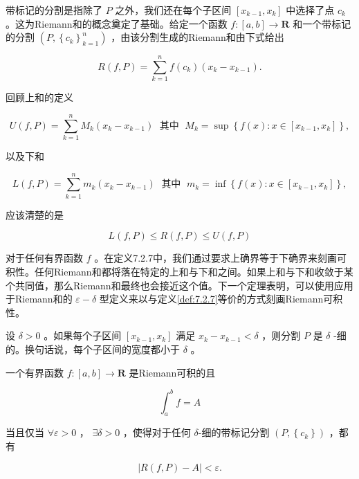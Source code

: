 带标记的分割是指除了 \(P\) 之外，我们还在每个子区间 \(\left\lbrack  {{x}_{k - 1},{x}_{k}}\right\rbrack\) 中选择了点 \({c}_{k}\) 。这为Riemann和的概念奠定了基础。给定一个函数 \(f : \left\lbrack  {a,b}\right\rbrack   \rightarrow  \mathbf{R}\) 和一个带标记的分割 \(\left( {P,{\left\{  {c}_{k}\right\}  }_{k = 1}^{n}}\right)\) ，由该分割生成的Riemann和由下式给出

\[
R\left( {f,P}\right)  = \mathop{\sum }\limits_{{k = 1}}^{n}f\left( {c}_{k}\right) \left( {{x}_{k} - {x}_{k - 1}}\right) .
\]

回顾上和的定义

\[
U\left( {f,P}\right)  = \mathop{\sum }\limits_{{k = 1}}^{n}{M}_{k}\left( {{x}_{k} - {x}_{k - 1}}\right) \;\text{ 其中 }\;{M}_{k} = \sup \left\{  {f\left( x\right)  : x \in  \left\lbrack  {{x}_{k - 1},{x}_{k}}\right\rbrack  }\right\}  ,
\]

以及下和

\[
L\left( {f,P}\right)  = \mathop{\sum }\limits_{{k = 1}}^{n}{m}_{k}\left( {{x}_{k} - {x}_{k - 1}}\right) \;\text{ 其中 }\;{m}_{k} = \inf \left\{  {f\left( x\right)  : x \in  \left\lbrack  {{x}_{k - 1},{x}_{k}}\right\rbrack  }\right\}  ,
\]

应该清楚的是

\[
L\left( {f,P}\right)  \leq  R\left( {f,P}\right)  \leq  U\left( {f,P}\right)
\]

对于任何有界函数 \(f\) 。在定义7.2.7中，我们通过要求上确界等于下确界来刻画可积性。任何Riemann和都将落在特定的上和与下和之间。如果上和与下和收敛于某个共同值，那么Riemann和最终也会接近这个值。下一个定理表明，可以使用应用于Riemann和的 \(\varepsilon  - \delta\) 型定义来以与定义\ref{def:7.2.7}等价的方式刻画Riemann可积性。

\begin{Def}
  \label{def:8.1.1}
  设 \(\delta  > 0\) 。如果每个子区间 \(\left\lbrack  {{x}_{k - 1},{x}_{k}}\right\rbrack\) 满足 \({x}_{k} - {x}_{k - 1} < \delta\) ，则分割 \(P\) 是 \(\delta\) -细的。换句话说，每个子区间的宽度都小于 \(\delta\) 。
\end{Def}


\begin{Thm}
  \label{thm:8.1.2}
  一个有界函数 \(f : \left\lbrack  {a,b}\right\rbrack   \rightarrow  \mathbf{R}\) 是Riemann可积的且

\[
{\int }_{a}^{b}f = A
\]

当且仅当 \(\forall \varepsilon  > 0\) ， \(\exists \delta  > 0\) ，使得对于任何 \(\delta\)-细的带标记分割 \(\left( {P,\left\{  {c}_{k}\right\}  }\right)\) ，都有

\[
\left| {R\left( {f,P}\right)  - A}\right|  < \varepsilon .
\]
\end{Thm}


